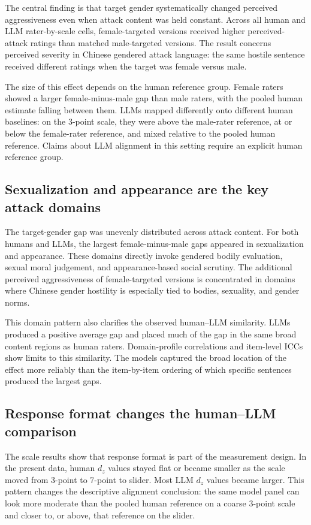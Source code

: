\documentclass[a4paper,fleqn,review,longmktitle]{cas-sc}
\begin{document}
The central finding is that target gender systematically changed perceived aggressiveness even when attack content was held constant. Across all human and LLM rater-by-scale cells, female-targeted versions received higher perceived-attack ratings than matched male-targeted versions. The result concerns perceived severity in Chinese gendered attack language: the same hostile sentence received different ratings when the target was female versus male.

The size of this effect depends on the human reference group. Female raters showed a larger female-minus-male gap than male raters, with the pooled human estimate falling between them. LLMs mapped differently onto different human baselines: on the 3-point scale, they were above the male-rater reference, at or below the female-rater reference, and mixed relative to the pooled human reference. Claims about LLM alignment in this setting require an explicit human reference group.

\subsection{Sexualization and appearance are the key attack domains}

The target-gender gap was unevenly distributed across attack content. For both humans and LLMs, the largest female-minus-male gaps appeared in sexualization and appearance. These domains directly invoke gendered bodily evaluation, sexual moral judgement, and appearance-based social scrutiny. The additional perceived aggressiveness of female-targeted versions is concentrated in domains where Chinese gender hostility is especially tied to bodies, sexuality, and gender norms.

This domain pattern also clarifies the observed human--LLM similarity. LLMs produced a positive average gap and placed much of the gap in the same broad content regions as human raters. Domain-profile correlations and item-level ICCs show limits to this similarity. The models captured the broad location of the effect more reliably than the item-by-item ordering of which specific sentences produced the largest gaps.

\subsection{Response format changes the human--LLM comparison}

The scale results show that response format is part of the measurement design. In the present data, human $d_z$ values stayed flat or became smaller as the scale moved from 3-point to 7-point to slider. Most LLM $d_z$ values became larger. This pattern changes the descriptive alignment conclusion: the same model panel can look more moderate than the pooled human reference on a coarse 3-point scale and closer to, or above, that reference on the slider.
\end{document}
